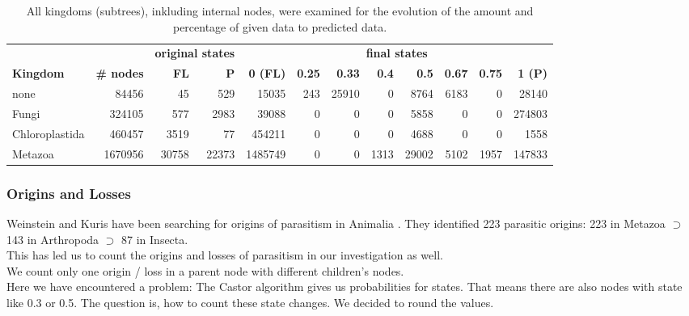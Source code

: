       \begin{table}[h!]
        \begin{center}
          \hspace*{-2cm}\begin{tabular}{ |l|r||r|r||r|r|r|r|r|r|r|r| }
            \hline
            & & \multicolumn{2}{c||}{\bfseries original states} & \multicolumn{8}{c|}{\bfseries final states} \\
            \bfseries Kingdom & \bfseries \# nodes & \bfseries FL & \bfseries P
              & \bfseries 0 (FL) & \bfseries 0.25 & \bfseries 0.33 & \bfseries 0.4 & \bfseries 0.5 & \bfseries 0.67 & \bfseries 0.75 & \bfseries 1 (P) \\
            \hline \hline
            none & 84456 & 45 & 529 
              & 15035 & 243 & 25910 & 0 & 8764 & 6183 & 0 & 28140 \\
            Fungi & 324105 & 577 & 2983
              & 39088 & 0 & 0 & 0 & 5858 & 0 & 0 & 274803 \\
            Chloroplastida & 460457 & 3519 & 77
              & 454211 & 0 & 0 & 0 & 4688 & 0 & 0 & 1558 \\
            Metazoa & 1670956 & 30758 & 22373
              & 1485749 & 0 & 0 & 1313 & 29002 & 5102 & 1957 & 147833 \\
            \hline  
          \end{tabular}
        \end{center}
        \caption{All kingdoms (subtrees), inkluding internal nodes, were examined for the evolution of the 
        amount and percentage of given data to predicted data.}
        \label{table:Kingdom internal nodes}
      \end{table}

      \subsubsection{Origins and Losses} \label{sec:results - origins and losses}

        Weinstein and Kuris have been searching for origins of parasitism in Animalia \cite{Weinstein2016}. 
          They identified 223 parasitic origins: 223 in Metazoa $\supset$ 143 in Arthropoda $\supset$ 87 
          in Insecta. \\
        This has led us to count the origins and losses of parasitism in our investigation as well. \\
        We count only one origin / loss in a parent node with different children's nodes. \\
        Here we have encountered a problem: The Castor algorithm gives us probabilities for states. That 
          means there are also nodes with state like 0.3 or 0.5. The question is, how to count these state 
          changes. We decided to round the values.

